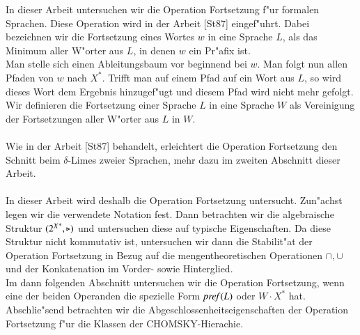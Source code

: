 In dieser Arbeit untersuchen wir die Operation Fortsetzung f"ur formalen Sprachen.
Diese Operation wird in der Arbeit [St87] eingef"uhrt. Dabei bezeichnen wir die Fortsetzung eines Wortes $w$ in eine Sprache $L$, als das Minimum aller W"orter aus $L$, in denen $w$ ein Pr"afix ist. 
\\Man stelle sich einen Ableitungsbaum vor beginnend bei $w$.
Man folgt nun allen Pfaden von $w$ nach $X^*$. Trifft man auf einem Pfad auf ein Wort aus $L$, so wird dieses Wort dem Ergebnis hinzugef"ugt und diesem Pfad wird nicht mehr gefolgt.\\
Wir definieren die Fortsetzung einer Sprache $L$ in eine Sprache $W$ als Vereinigung der Fortsetzungen aller W"orter aus $L$ in $W$.\\\\
Wie in der Arbeit [St87] behandelt, erleichtert die Operation Fortsetzung den Schnitt beim $\delta$-Limes zweier Sprachen, mehr dazu im zweiten Abschnitt dieser Arbeit.\\\\
In dieser Arbeit wird deshalb die Operation Fortsetzung untersucht. Zun"achst legen wir die verwendete Notation fest. Dann betrachten wir die algebraische Struktur $({2^X}^*,\triangleright)$ und untersuchen diese auf typische Eigenschaften.
Da diese Struktur nicht kommutativ ist, untersuchen wir dann die Stabilit"at der Operation Fortsetzung in Bezug auf die mengentheoretischen Operationen $\cap,\cup$ und der Konkatenation im Vorder- sowie Hinterglied.
\\Im dann folgenden Abschnitt untersuchen wir die Operation Fortsetzung, wenn eine der beiden Operanden die spezielle Form $\mathit{pref{(}}L)$ oder $W\cdot X^*$ hat. Abschlie"send betrachten wir die Abgeschlossenheitseigenschaften der Operation Fortsetzung f"ur die Klassen der CHOMSKY-Hierachie.



